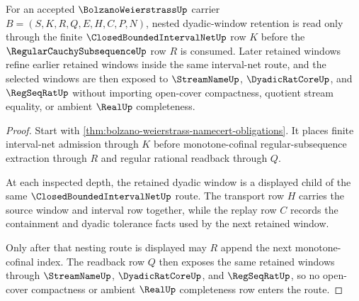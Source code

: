 \begin{theorem}
\label{thm:bolzano-weierstrass-interval-nesting-route}
For an accepted $\BolzanoWeierstrassUp$ carrier $B=(S,K,R,Q,E,H,C,P,N)$, nested dyadic-window retention is read only through the finite $\ClosedBoundedIntervalNetUp$ row $K$ before the $\RegularCauchySubsequenceUp$ row $R$ is consumed. Later retained windows refine earlier retained windows inside the same interval-net route, and the selected windows are then exposed to $\StreamNameUp$, $\DyadicRatCoreUp$, and $\RegSeqRatUp$ without importing open-cover compactness, quotient stream equality, or ambient $\RealUp$ completeness.
\end{theorem}
\begin{proof}
Start with \autoref{thm:bolzano-weierstrass-namecert-obligations}. It places finite interval-net admission through $K$ before monotone-cofinal regular-subsequence extraction through $R$ and regular rational readback through $Q$.

At each inspected depth, the retained dyadic window is a displayed child of the same $\ClosedBoundedIntervalNetUp$ route. The transport row $H$ carries the source window and interval row together, while the replay row $C$ records the containment and dyadic tolerance facts used by the next retained window.

Only after that nesting route is displayed may $R$ append the next monotone-cofinal index. The readback row $Q$ then exposes the same retained windows through $\StreamNameUp$, $\DyadicRatCoreUp$, and $\RegSeqRatUp$, so no open-cover compactness or ambient $\RealUp$ completeness row enters the route.
\end{proof}

